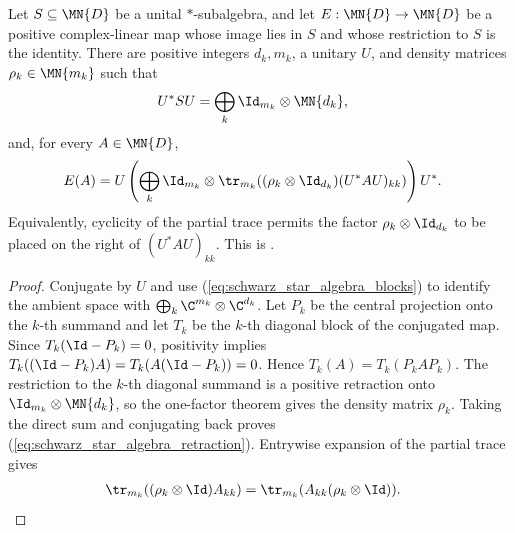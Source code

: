 \begin{theorem}
    \label{thm:positive_retraction_finite_star_algebra}
    \leanok
    Let $S\subseteq\MN{D}$ be a unital $*$-subalgebra, and let
    $E:\MN{D}\to\MN{D}$ be a positive complex-linear map whose image lies in
    $S$ and whose restriction to $S$ is the identity. There are positive
    integers $d_k,m_k$, a unitary $U$, and density matrices
    $\rho_k\in\MN{m_k}$ such that
    \begin{align}
        U^*SU
         & =\bigoplus_k \Id_{m_k}\otimes\MN{d_k},
        \label{eq:schwarz_star_algebra_blocks}
    \end{align}
    and, for every $A\in\MN{D}$,
    \begin{align}
        E(A)
         & =U\left(\bigoplus_k \Id_{m_k}\otimes
             \tr_{m_k}\!\left((\rho_k\otimes\Id_{d_k})(U^*AU)_{kk}\right)\right)U^*.
        \label{eq:schwarz_star_algebra_retraction}
    \end{align}
    Equivalently, cyclicity of the partial trace permits the factor
    $\rho_k\otimes\Id_{d_k}$ to be placed on the right of $(U^*AU)_{kk}$.
    This is \cite[Proposition~1.5 and Equation~(1.40)]{Wolf2012Quantum}.
\end{theorem}

\begin{proof}
    \leanok
    Conjugate by $U$ and use (\ref{eq:schwarz_star_algebra_blocks}) to
    identify the ambient space with
    $\bigoplus_k\C^{m_k}\otimes\C^{d_k}$. Let $P_k$ be the central projection
    onto the $k$-th summand and let $T_k$ be the $k$-th diagonal block of the
    conjugated map. Since $T_k(\Id-P_k)=0$, positivity implies
    $T_k((\Id-P_k)A)=T_k(A(\Id-P_k))=0$.
    Hence $T_k(A)=T_k(P_kAP_k)$. The restriction to the $k$-th diagonal
    summand is a positive retraction onto
    $\Id_{m_k}\otimes\MN{d_k}$, so the one-factor theorem gives the density
    matrix $\rho_k$. Taking the direct sum and conjugating back proves
    (\ref{eq:schwarz_star_algebra_retraction}). Entrywise expansion of the
    partial trace gives
    \begin{align}
        \tr_{m_k}((\rho_k\otimes\Id)A_{kk})
         & =\tr_{m_k}(A_{kk}(\rho_k\otimes\Id)).
        \notag
    \end{align}
\end{proof}

